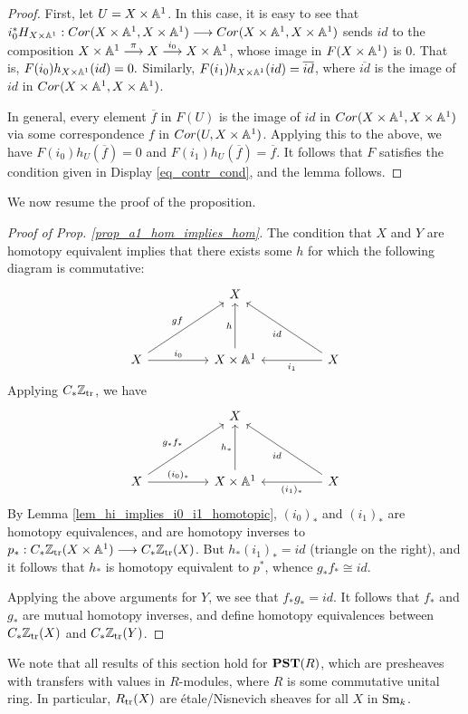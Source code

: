 \begin{proof}
First, let $U = X \times \mathbb{A}^1$. In this case, it is easy to see
that $i_0^* H_{X \times \mathbb{A}^1} : Cor(X \times \mathbb{A}^1, X \times \mathbb{A}^1) 
\longrightarrow Cor( X \times \mathbb{A}^1, X \times \mathbb{A}^1)$ sends $id$ to the 
composition $X \times \mathbb{A}^1 \stackrel{\pi}{\longrightarrow} X 
\stackrel{i_0}{\longrightarrow} X \times \mathbb{A}^1$, whose image in $F(X \times 
\mathbb{A}^1)$ is 0. That is, $F(i_0)h_{X \times \mathbb{A}^1}(id) = 0.$ 
Similarly, $F(i_1)h_{X \times \mathbb{A}^1}(id) = \overline{id}$, where
$\overline{id}$ is the image of $id$ in $Cor(X \times \mathbb{A}^1, X 
\times \mathbb{A}^1)$. 

In general, every element $\overline{f}$ in $F(U)$ is the image
of $id$ in $Cor(X \times \mathbb{A}^1, X \times \mathbb{A}^1)$ via some 
correspondence $f$ in $Cor(U, X \times \mathbb{A}^1)$. Applying this
to the above, we have $F(i_0)h_U(\overline{f}) = 0$ and $F(i_1)
h_U(\overline{f}) = \overline{f}$. It follows that $F$ satisfies
the condition given in Display \ref{eq_contr_cond}, and the lemma
follows.
\end{proof}

We now resume the proof of the proposition.

\begin{proof}[Proof of Prop. \ref{prop_a1_hom_implies_hom}]
The condition that $X$ and $Y$ are homotopy equivalent implies
that there exists some $h$ for which the following diagram is
commutative:
\[
\begin{tikzcd}[column sep=huge, row sep=huge]
{}& X \\
X \arrow{ru}{gf} \arrow{r}{i_0} &
X \times \A^1 \arrow{u}{h} &
X \arrow{l}{i_1} \arrow{lu}{id}
\end{tikzcd}
\]
Applying $C_{*} \mathbb{Z}_{\mathrm{tr}}$, we have
\[
\begin{tikzcd}[column sep=huge, row sep=huge]
{}& X \\
X \arrow{ru}{g_*f_*} \arrow{r}{(i_0)_*} &
X \times \A^1 \arrow{u}{h_*} &
X \arrow{l}{(i_1)_*} \arrow{lu}{id}
\end{tikzcd}
\]
By Lemma \ref{lem_hi_implies_i0_i1_homotopic}, $(i_0)_*$ and 
$(i_1)_*$ are homotopy equivalences, and are homotopy inverses to 
$p_* : C_{*} \mathbb{Z}_{\mathrm{tr}}(X \times \mathbb{A}^1) \longrightarrow C_{*} \mathbb{Z}_{\mathrm{tr}}(X)$. But 
$h_* (i_1)_* = id$ (triangle on the right), and it follows that 
$h_*$ is homotopy equivalent to $p^*$, whence $g_*f_* \cong id$.

Applying the above arguments for $Y$, we see that $f_*g_* = id$.
It follows that $f_*$ and $g_*$ are mutual homotopy inverses, and
define homotopy equivalences between $C_{*} \mathbb{Z}_{\mathrm{tr}}(X)$ and $C_{*}
\mathbb{Z}_{\mathrm{tr}}(Y)$.
\end{proof}

\begin{rmk}
We note that all results of this section hold for $\mathbf{PST}(R)$, which
are presheaves with transfers with values in $R$-modules, where $R$
is some commutative unital ring. In particular, $R_{\mathrm{tr}}(X)$ are
\'etale/Nisnevich sheaves for all $X$ in $\mathrm{Sm}_{k}$.
\end{rmk}

